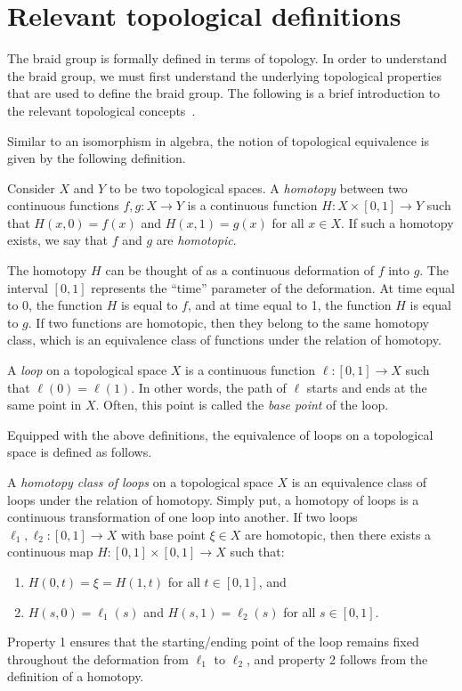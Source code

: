 \chapter{Relevant topological definitions}\label{ch:top_background}

The braid group is formally defined in terms of topology. In order to understand the braid group, we must first understand the underlying topological properties that are used to define the braid group. The following is a brief introduction to the relevant topological concepts~\cite{Fulton1997,Kassel2008}.

Similar to an isomorphism in algebra, the notion of topological equivalence is given by the following definition.
\begin{definition}
    Consider $X$ and $Y$ to be two topological spaces. A \textit{homotopy} between two continuous functions $f,g:X\to Y$ is a continuous function $H:X\times[0,1]\to Y$ such that $H(x,0)=f(x)$ and $H(x,1)=g(x)$ for all $x\in X$. If such a homotopy exists, we say that $f$ and $g$ are \textit{homotopic}.
\end{definition}
The homotopy $H$ can be thought of as a continuous deformation of $f$ into $g$. The interval $\left[ 0,1 \right]$ represents the ``time'' parameter of the deformation. At time equal to 0, the function $H$ is equal to $f$, and at time equal to 1, the function $H$ is equal to $g$. If two functions are homotopic, then they belong to the same homotopy class, which is an equivalence class of functions under the relation of homotopy.

\begin{definition}
    A \textit{loop} on a topological space $X$ is a continuous function $\ell:[0,1]\to X$ such that $\ell(0) = \ell(1)$. In other words, the path of $\ell$ starts and ends at the same point in $X$. Often, this point is called the \textit{base point} of the loop.
\end{definition}

Equipped with the above definitions, the equivalence of loops on a topological space is defined as follows.
\begin{definition}
    A \textit{homotopy class of loops} on a topological space $X$ is an equivalence class of loops under the relation of homotopy. Simply put, a homotopy of loops is a continuous transformation of one loop into another. If two loops $\ell_1,\ell_2:[0,1]\to X$ with base point $\xi\in X$ are homotopic, then there exists a continuous map $H:[0,1]\times [0,1]\to X$ such that:
    \begin{enumerate}
        \item $H(0,t) = \xi = H(1,t)$ for all $t\in [0,1]$, and
        \item $H(s,0) = \ell_1(s)$ and $H(s,1) = \ell_2(s)$ for all $s\in [0,1]$.
    \end{enumerate}
    Property 1 ensures that the starting/ending point of the loop remains fixed throughout the deformation from $\ell_1$ to $\ell_2$, and property 2 follows from the definition of a homotopy.
\end{definition}

